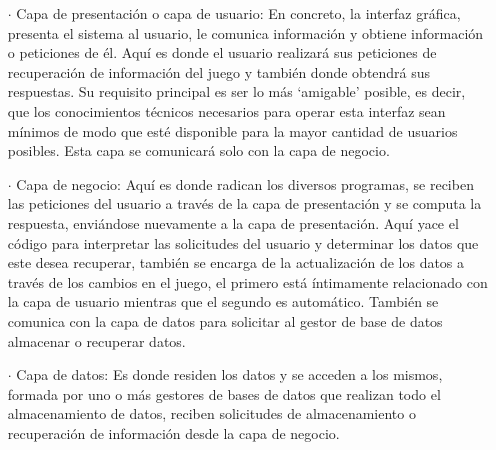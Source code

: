\begin{enumerate}
  \item[\(\cdot\)] Capa de presentación o capa de usuario: En concreto, la interfaz gráfica, presenta el sistema al usuario, le comunica información y obtiene información o peticiones de él. Aquí es donde el usuario realizará sus peticiones de recuperación de información del juego y también donde obtendrá sus respuestas. Su requisito principal es ser lo más ‘amigable’ posible, es decir, que los conocimientos técnicos necesarios para operar esta interfaz sean mínimos de modo que esté disponible para la mayor cantidad de usuarios posibles. Esta capa se comunicará solo con la capa de negocio. 
  \item[\(\cdot\)] Capa de negocio: Aquí es donde radican los diversos programas, se reciben las peticiones del usuario a través de la capa de presentación y se computa la respuesta, enviándose nuevamente a la capa de presentación. Aquí yace el código para interpretar las solicitudes del usuario y determinar los datos que este desea recuperar, también se encarga de la actualización de los datos a través de los cambios en el juego, el primero está íntimamente relacionado con la capa de usuario mientras que el segundo es automático. También se comunica con la capa de datos para solicitar al gestor de base de datos almacenar o recuperar datos.
  \item[\(\cdot\)] Capa de datos: Es donde residen los datos y se acceden a los mismos, formada por uno o más gestores de bases de datos que realizan todo el almacenamiento de datos, reciben solicitudes de almacenamiento o recuperación de información desde la capa de negocio.
\end{enumerate}
